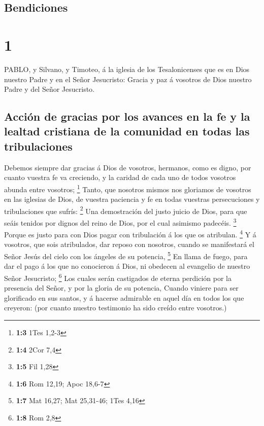 \hypertarget{bendiciones}{%
\subsection{Bendiciones}\label{bendiciones}}

\hypertarget{section}{%
\section{1}\label{section}}

 PABLO, y Silvano, y Timoteo, á la iglesia de los
Tesalonicenses que es en Dios nuestro Padre y en el Señor Jesucristo:
 Gracia y paz á vosotros de Dios nuestro Padre y del Señor
Jesucristo.

\hypertarget{acciuxf3n-de-gracias-por-los-avances-en-la-fe-y-la-lealtad-cristiana-de-la-comunidad-en-todas-las-tribulaciones}{%
\subsection{Acción de gracias por los avances en la fe y la lealtad
cristiana de la comunidad en todas las
tribulaciones}\label{acciuxf3n-de-gracias-por-los-avances-en-la-fe-y-la-lealtad-cristiana-de-la-comunidad-en-todas-las-tribulaciones}}

 Debemos siempre dar gracias á Dios de vosotros, hermanos,
como es digno, por cuanto vuestra fe va creciendo, y la caridad de cada
uno de todos vosotros abunda entre vosotros; \footnote{\textbf{1:3} 1Tes
  1,2-3}  Tanto, que nosotros mismos nos gloriamos de
vosotros en las iglesias de Dios, de vuestra paciencia y fe en todas
vuestras persecuciones y tribulaciones que sufrís: \footnote{\textbf{1:4}
  2Cor 7,4}  Una demostración del justo juicio de Dios, para
que seáis tenidos por dignos del reino de Dios, por el cual asimismo
padecéis. \footnote{\textbf{1:5} Fil 1,28}  Porque es justo
para con Dios pagar con tribulación á los que os atribulan. \footnote{\textbf{1:6}
  Rom 12,19; Apoc 18,6-7}  Y á vosotros, que sois
atribulados, dar reposo con nosotros, cuando se manifestará el Señor
Jesús del cielo con los ángeles de su potencia, \footnote{\textbf{1:7}
  Mat 16,27; Mat 25,31-46; 1Tes 4,16}  En llama de fuego,
para dar el pago á los que no conocieron á Dios, ni obedecen al
evangelio de nuestro Señor Jesucristo; \footnote{\textbf{1:8} Rom 2,8}
 Los cuales serán castigados de eterna perdición por la
presencia del Señor, y por la gloria de su potencia, 
Cuando viniere para ser glorificado en sus santos, y á hacerse admirable
en aquel día en todos los que creyeron: (por cuanto nuestro testimonio
ha sido creído entre vosotros.)

